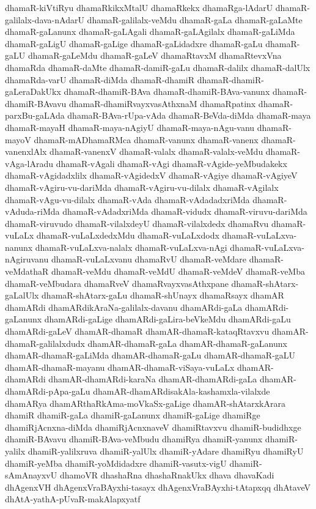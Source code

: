 {dhamaR-kiVtiRyu
dhamaRkikxMtalU
dhamaRkekx
dhamaRga-lAdarU
dhamaR-galilalx-dava-nAdarU
dhamaR-galilalx-veMdu
dhamaR-gaLa
dhamaR-gaLaMte
dhamaR-gaLanunx
dhamaR-gaLAgali
dhamaR-gaLAgilalx
dhamaR-gaLiMda
dhamaR-gaLigU
dhamaR-gaLige
dhamaR-gaLidadxre
dhamaR-gaLu
dhamaR-gaLU
dhamaR-gaLeMdu
dhamaR-gaLeV
dhamaRtavxM
dhamaRtevxVna
dhamaRda
dhamaR-daMte
dhamaR-damiR-gaLu
dhamaR-dalilx
dhamaR-dalUlx
dhamaRda-varU
dhamaR-diMda
dhamaR-dhamiR
dhamaR-dhamiR-gaLeraDakUkx
dhamaR-dhamiR-BAva
dhamaR-dhamiR-BAva-vanunx
dhamaR-dhamiR-BAvavu
dhamaR-dhamiRvayxvasAthxnaM
dhamaRpatinx
dhamaR-parxBu-gaLAda
dhamaR-BAva-rUpa-vAda
dhamaR-BeVda-diMda
dhamaR-maya
dhamaR-mayaH
dhamaR-maya-nAgiyU
dhamaR-maya-nAgu-vanu
dhamaR-mayoV
dhamaR-mADhamaRMca
dhamaR-vanunx
dhamaR-vanenx
dhamaR-vanenxlAlx
dhamaR-vanenxV
dhamaR-valalx
dhamaR-valalx-veMdu
dhamaR-vAga-lAradu
dhamaR-vAgali
dhamaR-vAgi
dhamaR-vAgide-yeMbudakekx
dhamaR-vAgidadxlilx
dhamaR-vAgidedxV
dhamaR-vAgiye
dhamaR-vAgiyeV
dhamaR-vAgiru-vu-dariMda
dhamaR-vAgiru-vu-dilalx
dhamaR-vAgilalx
dhamaR-vAgu-vu-dilalx
dhamaR-vAda
dhamaR-vAdadadxriMda
dhamaR-vAduda-riMda
dhamaR-vAdadxriMda
dhamaR-vidudx
dhamaR-viruvu-dariMda
dhamaR-viruvudo
dhamaR-vilalxdeyU
dhamaR-vilalxdedx
dhamaRvu
dhamaR-vuLaLx
dhamaR-vuLaLxdedxMdu
dhamaR-vuLaLxdodx
dhamaR-vuLaLxva-nanunx
dhamaR-vuLaLxva-nalalx
dhamaR-vuLaLxva-nAgi
dhamaR-vuLaLxva-nAgiruvanu
dhamaR-vuLaLxvanu
dhamaRvU
dhamaR-veMdare
dhamaR-veMdathaR
dhamaR-veMdu
dhamaR-veMdU
dhamaR-veMdeV
dhamaR-veMba
dhamaR-veMbudara
dhamaRveV
dhamaRvayxvasAthxpane
dhamaR-shAtarx-gaLalUlx
dhamaR-shAtarx-gaLu
dhamaR-shUnayx
dhamaRsayx
dhamAR
dhamARdi
dhamARdikAraNa-galilalx-davanu
dhamARdi-gaLa
dhamARdi-gaLanunx
dhamARdi-gaLige
dhamARdi-gaLira-beVkeMdu
dhamARdi-gaLu
dhamARdi-gaLeV
dhamAR-dhamaR
dhamAR-dhamaR-kataqRtavxvu
dhamAR-dhamaR-galilalxdudx
dhamAR-dhamaR-gaLa
dhamAR-dhamaR-gaLanunx
dhamAR-dhamaR-gaLiMda
dhamAR-dhamaR-gaLu
dhamAR-dhamaR-gaLU
dhamAR-dhamaR-mayanu
dhamAR-dhamaR-viSaya-vuLaLx
dhamAR-dhamARdi
dhamAR-dhamARdi-karaNa
dhamAR-dhamARdi-gaLa
dhamAR-dhamARdi-pApa-gaLu
dhamAR-dhamARdisakAla-kashamxla-vilalxde
dhamARya
dhamARthaRkAma-moVkaSx-gaLige
dhamAR-shAtarxkArara
dhamiR
dhamiR-gaLa
dhamiR-gaLanunx
dhamiR-gaLige
dhamiRge
dhamiRjAcnxna-diMda
dhamiRjAcnxnaveV
dhamiRtavxvu
dhamiR-budidhxge
dhamiR-BAvavu
dhamiR-BAva-veMbudu
dhamiRya
dhamiR-yanunx
dhamiR-yalilx
dhamiR-yalilxruva
dhamiR-yalUlx
dhamiR-yAdare
dhamiRyu
dhamiRyU
dhamiR-yeMba
dhamiR-yoMdidadxre
dhamiR-vasutx-vigU
dhamiR-sAmAnayxvU
dhamoVR
dhashaRna
dhashaRnakUkx
dhava
dhavaKadi
dhAgenxVH
dhAgenxVraBAyxhi-tasayx
dhAgenxVraBAyxhi-tAtapxqq
dhAtaveV
dhAtA-yathA-pUvaR-makAlapxyatf
}
